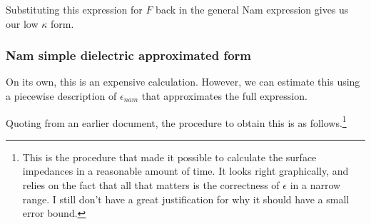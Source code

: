 \documentclass[../main.tex]{subfiles}
\begin{document}
	Substituting this expression for $F$ back in the general Nam expression gives us our low $\kappa$ form.

	\subsubsection{Nam simple dielectric approximated form}

	On its own, this is an expensive calculation.
	However, we can estimate this using a piecewise description of $\epsilon_{nam}$ that approximates the full expression.

	Quoting from an earlier document, the procedure to obtain this is as follows.\footnote{This is the procedure that made it possible to calculate the surface impedances in a reasonable amount of time.
	It looks right graphically, and relies on the fact that all that matters is the correctness of $\epsilon$ in a narrow range.
	I still don't have a great justification for why it should have a small error bound.}
\end{document}
